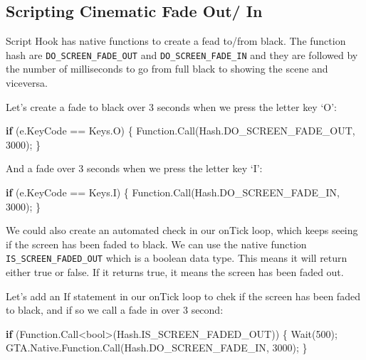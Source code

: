 \documentclass[
  openany]{book}
\newenvironment{Shaded}{\begin{snugshade}}{\end{snugshade}}
\newcommand{\DataTypeTok}[1]{\textcolor[rgb]{0.13,0.29,0.53}{#1}}
\newcommand{\DecValTok}[1]{\textcolor[rgb]{0.00,0.00,0.81}{#1}}
\newcommand{\FunctionTok}[1]{\textcolor[rgb]{0.00,0.00,0.00}{#1}}
\newcommand{\KeywordTok}[1]{\textcolor[rgb]{0.13,0.29,0.53}{\textbf{#1}}}
\newcommand{\NormalTok}[1]{#1}
\begin{document}
\hypertarget{scripting-cinematic-fade-out-in}{%
\subsection*{Scripting Cinematic Fade Out/ In}\label{scripting-cinematic-fade-out-in}}

Script Hook has native functions to create a fead to/from black. The function hash are \texttt{DO\_SCREEN\_FADE\_OUT} and \texttt{DO\_SCREEN\_FADE\_IN} and they are followed by the number of milliseconds to go from full black to showing the scene and viceversa.

Let's create a fade to black over 3 seconds when we press the letter key `O':

\begin{Shaded}
\begin{Highlighting}[]
\KeywordTok{if}\NormalTok{ (e.}\FunctionTok{KeyCode}\NormalTok{ == Keys.}\FunctionTok{O}\NormalTok{)}
\NormalTok{\{}
\NormalTok{    Function.}\FunctionTok{Call}\NormalTok{(Hash.}\FunctionTok{DO_SCREEN_FADE_OUT}\NormalTok{, }\DecValTok{3000}\NormalTok{);}
\NormalTok{\}}
\end{Highlighting}
\end{Shaded}

And a fade over 3 seconds when we press the letter key `I':

\begin{Shaded}
\begin{Highlighting}[]
\KeywordTok{if}\NormalTok{ (e.}\FunctionTok{KeyCode}\NormalTok{ == Keys.}\FunctionTok{I}\NormalTok{)}
\NormalTok{\{}
\NormalTok{    Function.}\FunctionTok{Call}\NormalTok{(Hash.}\FunctionTok{DO_SCREEN_FADE_IN}\NormalTok{, }\DecValTok{3000}\NormalTok{);}
\NormalTok{\}}
\end{Highlighting}
\end{Shaded}

We could also create an automated check in our onTick loop, which keeps seeing if the screen has been faded to black. We can use the native function \texttt{IS\_SCREEN\_FADED\_OUT} which is a boolean data type. This means it will return either true or false. If it returns true, it means the screen has been faded out.

Let's add an If statement in our onTick loop to chek if the screen has been faded to black, and if so we call a fade in over 3 second:

\begin{Shaded}
\begin{Highlighting}[]
\KeywordTok{if}\NormalTok{ (Function.}\FunctionTok{Call}\NormalTok{<}\DataTypeTok{bool}\NormalTok{>(Hash.}\FunctionTok{IS_SCREEN_FADED_OUT}\NormalTok{))}
\NormalTok{\{}
    \FunctionTok{Wait}\NormalTok{(}\DecValTok{500}\NormalTok{);}
\NormalTok{    GTA.}\FunctionTok{Native}\NormalTok{.}\FunctionTok{Function}\NormalTok{.}\FunctionTok{Call}\NormalTok{(Hash.}\FunctionTok{DO_SCREEN_FADE_IN}\NormalTok{, }\DecValTok{3000}\NormalTok{);}
\NormalTok{\}}
\end{Highlighting}
\end{Shaded}
\end{document}
